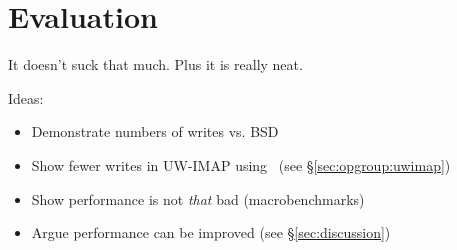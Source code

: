 \section {Evaluation}
\label{sec:evaluation}

It doesn't suck that much. Plus it is really neat.

Ideas:
\begin{itemize}
\item Demonstrate numbers of writes vs. BSD
\item Show fewer writes in UW-IMAP using \opgroups\ (see \S\ref{sec:opgroup:uwimap})
\item Show performance is not \emph{that} bad (macrobenchmarks)
\item Argue performance can be improved (see \S\ref{sec:discussion})
\end{itemize}
